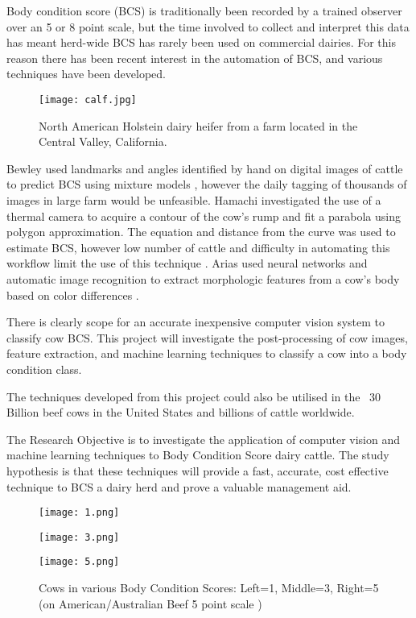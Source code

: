 \documentclass[11pt]{article}
\begin{document}
		Body condition score (BCS) is traditionally been recorded by a trained observer over an 5 or 8 point scale\cite{Bewley2010}, but the time involved to collect and interpret this data has meant herd-wide BCS has rarely been used on commercial dairies.
		For this reason there has been recent interest in the automation of BCS, and various techniques have been developed.


		\begin{figure}[b!]
			\centering
			\texttt{[image: calf.jpg]}
			\caption{North American Holstein dairy heifer from a farm located in the Central Valley, California.}
			\label{fig:}
		\end{figure}
		\newpage

		Bewley used landmarks and angles identified by hand on digital images of cattle to predict BCS using mixture models \cite{Bewley2008}, however the daily tagging of thousands of images in large farm would be unfeasible.
		Hamachi investigated the use of a thermal camera to acquire a contour of the cow's rump and fit a parabola using polygon approximation. 
		The equation and distance from the curve was used to estimate BCS, however low number of cattle and difficulty in automating this workflow limit the use of this technique \cite{Halachmi2008}. 
		Arias used neural networks and automatic image recognition to extract morphologic features from a cow's body based on color differences \cite{Arias2004}. 


		There is clearly scope for an accurate inexpensive computer vision system to classify cow BCS.
		This project will investigate the post-processing of cow images, feature extraction, and machine learning techniques to classify a cow into a body condition class.  


		The techniques developed from this project could also be utilised in the ~30 Billion beef cows in the United States\cite{USDA2013} and billions of cattle worldwide.

		The Research Objective is to investigate the application of computer vision and machine learning techniques to Body Condition Score dairy cattle.
		The study hypothesis is that these techniques will provide a fast, accurate, cost effective technique to BCS a dairy herd and prove a valuable management aid.


	\begin{figure}[h!]
		\centering
		\parbox{4cm}{\texttt{[image: 1.png]}}
		\parbox{4cm}{\texttt{[image: 3.png]}}
		\parbox{4cm}{\texttt{[image: 5.png]}}
		\caption{Cows in various Body Condition Scores: Left=1, Middle=3, Right=5 (on American/Australian Beef 5 point scale \cite{malmo2010})}
		\label{fig:}
	\end{figure}
\end{document}
